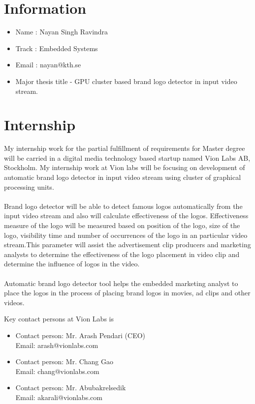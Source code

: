 \section{Information}
 \begin{itemize}
  \item Name  : Nayan Singh  Ravindra
  \item Track : Embedded Systems
  \item Email : nayan@kth.se
  \item Major thesis title -  GPU cluster based brand logo detector in input video stream.
 \end{itemize}
   
\section{Internship} 
  My internship work for the partial fulfillment of requirements for Master degree will be carried in a digital media technology based startup named Vion Labs AB, Stockholm. My internship work at Vion labs will be focusing on development of automatic brand logo detector in input video stream using cluster of graphical processing units. \\ \\
  Brand logo detector will be able to detect famous logos automatically from the input video stream and also will calculate effectiveness of the logos. Effectiveness measure of the logo will be measured based on position of the logo, size of the logo, visibility time and number of occurrences of the logo in an particular video stream.This parameter will assist the advertisement clip producers and marketing analysts to determine the effectiveness of the logo placement in video clip and determine the influence of logos in the video.\\ \\
  Automatic brand logo detector tool helps the embedded marketing analyst to place the logos in the process of placing brand logos in movies, ad clips and other videos. 
    
  Key contact persons at Vion Labs is
  \begin{itemize}
  \item Contact person: Mr. Arash Pendari (CEO) \\
        Email: arash@vionlabs.com        
  \item Contact person: Mr. Chang Gao\\
        Email: chang@vionlabs.com         
  \item Contact person: Mr. Abubakrelsedik \\
        Email: akarali@vionlabs.com         
  \end{itemize}
   
